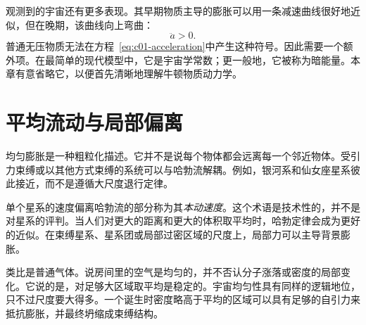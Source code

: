 观测到的宇宙还有更多表现。其早期物质主导的膨胀可以用一条减速曲线很好地近似，但在晚期，该曲线向上弯曲：
\begin{equation}
\ddot a>0.
\end{equation}
普通无压物质无法在方程~\eqref{eq:c01-acceleration}中产生这种符号。因此需要一个额外项。在最简单的现代模型中，它是宇宙学常数；更一般地，它被称为暗能量。本章有意省略它，以便首先清晰地理解牛顿物质动力学。

\begin{classroomqa}
\end{classroomqa}

\section{平均流动与局部偏离}

均匀膨胀是一种粗粒化描述。它并不是说每个物体都会远离每一个邻近物体。受引力束缚或以其他方式束缚的系统可以与哈勃流解耦。例如，银河系和仙女座星系彼此接近，而不是遵循大尺度退行定律。

单个星系的速度偏离哈勃流的部分称为其\emph{本动速度}。这个术语是技术性的，并不是对星系的评判。当人们对更大的距离和更大的体积取平均时，哈勃定律会成为更好的近似。在束缚星系、星系团或局部过密区域的尺度上，局部力可以主导背景膨胀。

\begin{classroomqa}
\end{classroomqa}

类比是普通气体。说房间里的空气是均匀的，并不否认分子涨落或密度的局部变化。它说的是，对足够大区域取平均是稳定的。宇宙均匀性具有同样的逻辑地位，只不过尺度要大得多。一个诞生时密度略高于平均的区域可以具有足够的自引力来抵抗膨胀，并最终坍缩成束缚结构。

\begin{classroomqa}
\end{classroomqa}

